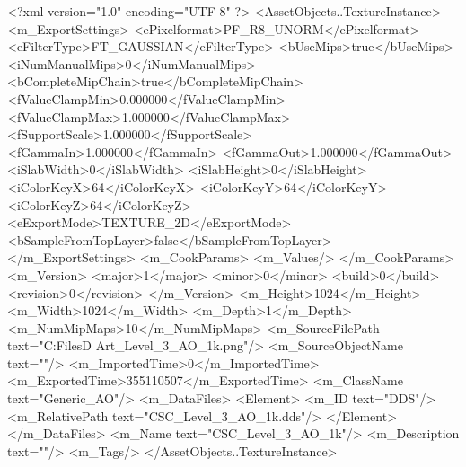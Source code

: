 <?xml version="1.0" encoding="UTF-8" ?>
<AssetObjects..TextureInstance>
	<m_ExportSettings>
		<ePixelformat>PF_R8_UNORM</ePixelformat>
		<eFilterType>FT_GAUSSIAN</eFilterType>
		<bUseMips>true</bUseMips>
		<iNumManualMips>0</iNumManualMips>
		<bCompleteMipChain>true</bCompleteMipChain>
		<fValueClampMin>0.000000</fValueClampMin>
		<fValueClampMax>1.000000</fValueClampMax>
		<fSupportScale>1.000000</fSupportScale>
		<fGammaIn>1.000000</fGammaIn>
		<fGammaOut>1.000000</fGammaOut>
		<iSlabWidth>0</iSlabWidth>
		<iSlabHeight>0</iSlabHeight>
		<iColorKeyX>64</iColorKeyX>
		<iColorKeyY>64</iColorKeyY>
		<iColorKeyZ>64</iColorKeyZ>
		<eExportMode>TEXTURE_2D</eExportMode>
		<bSampleFromTopLayer>false</bSampleFromTopLayer>
	</m_ExportSettings>
	<m_CookParams>
		<m_Values/>
	</m_CookParams>
	<m_Version>
		<major>1</major>
		<minor>0</minor>
		<build>0</build>
		<revision>0</revision>
	</m_Version>
	<m_Height>1024</m_Height>
	<m_Width>1024</m_Width>
	<m_Depth>1</m_Depth>
	<m_NumMipMaps>10</m_NumMipMaps>
	<m_SourceFilePath text="C:\Users\Shadow\Desktop\Working Files\3D Art\CSC_Level_3_AO_1k.png"/>
	<m_SourceObjectName text=""/>
	<m_ImportedTime>0</m_ImportedTime>
	<m_ExportedTime>355110507</m_ExportedTime>
	<m_ClassName text="Generic_AO"/>
	<m_DataFiles>
		<Element>
			<m_ID text="DDS"/>
			<m_RelativePath text="CSC_Level_3_AO_1k.dds"/>
		</Element>
	</m_DataFiles>
	<m_Name text="CSC_Level_3_AO_1k"/>
	<m_Description text=""/>
	<m_Tags/>
</AssetObjects..TextureInstance>

